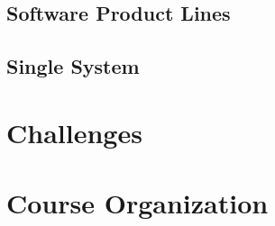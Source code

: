 \subsection{Software Product Lines}
\subsection{Single System}

%

\lessonslearned{
	\item \ldots
}{
	\item \ldots
}{
	\ldots
}

\sectionend

\section{Challenges}





\lessonslearned{
	\item \ldots
}{
	\item \ldots
}{
	\ldots
}

\sectionend

\section{Course Organization}




\lessonslearned{
	\item \ldots
}{
	\item \ldots
}{
	\ldots
}




